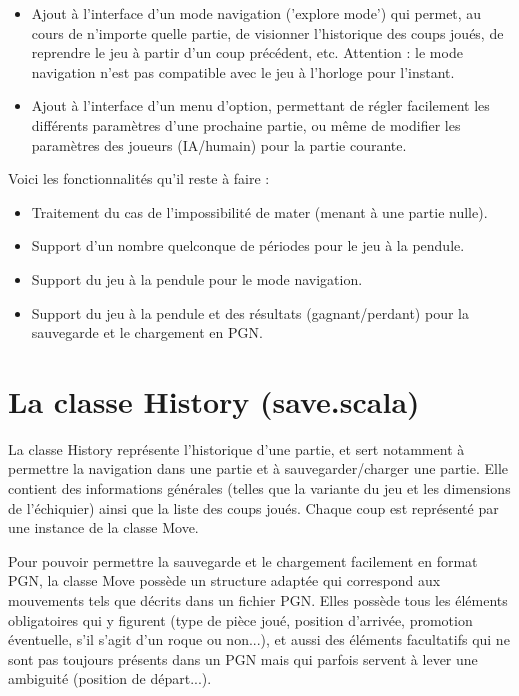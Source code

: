 \documentclass[11pt]{article}
\begin{document}
\begin{itemize}
\item Ajout à l'interface d'un mode navigation ('explore mode') qui permet, au cours de n'importe quelle partie, de visionner l'historique des coups joués, de reprendre le jeu à partir d'un coup précédent, etc. Attention : le mode navigation n'est pas compatible avec le jeu à l'horloge pour l'instant.

\item Ajout à l'interface d'un menu d'option, permettant de régler facilement les différents paramètres d'une prochaine partie, ou même de modifier les paramètres des joueurs (IA/humain) pour la partie courante.
\end{itemize}
\-

Voici les fonctionnalités qu'il reste à faire :\newline
\begin{itemize}
\item Traitement du cas de l'impossibilité de mater (menant à une partie nulle).
\item Support d'un nombre quelconque de périodes pour le jeu à la pendule.
\item Support du jeu à la pendule pour le mode navigation.
\item Support du jeu à la pendule et des résultats (gagnant/perdant) pour la sauvegarde et le chargement en PGN.
\end{itemize}
\-

\section{La classe History (save.scala)}

La classe History représente l'historique d'une partie, et sert notamment à permettre la navigation dans une partie et à sauvegarder/charger une partie. Elle contient des informations générales (telles que la variante du jeu et les dimensions de l'échiquier) ainsi que la liste des coups joués. Chaque coup est représenté par une instance de la classe Move.

Pour pouvoir permettre la sauvegarde et le chargement facilement en format PGN, la classe Move possède un structure adaptée qui correspond aux mouvements tels que décrits dans un fichier PGN. Elles possède tous les éléments obligatoires qui y figurent (type de pièce joué, position d'arrivée, promotion éventuelle, s'il s'agit d'un roque ou non...), et aussi des éléments facultatifs qui ne sont pas toujours présents dans un PGN mais qui parfois servent à lever une ambiguité (position de départ...).\newline
\end{document}
